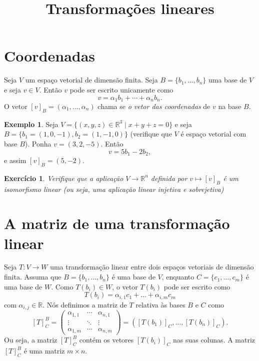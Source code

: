 \documentclass[12pt]{amsart}
\newcommand{\R}{\mathbb R}
\newtheorem{exercise}[theorem]{Exercício}
\theoremstyle{definition}
\newtheorem{example}[theorem]{Exemplo}
\begin{document}
\title{Transformações lineares}
\maketitle

\section{Coordenadas}
Seja $V$ um espaço vetorial de dimensão finita. Seja $B=\{b_1,\ldots,b_n\}$ uma base de $V$ e seja 
$v\in V$. Então $v$ pode ser escrito unicamente como 
\[
    v=\alpha_1b_1+\cdots+\alpha_nb_n.
\]
O vetor $[v]_B=(\alpha_1,\ldots,\alpha_n)$ chama se \emph{o vetor das coordenadas} de $v$ na base $B$.

\begin{example}
    Seja $V=\{(x,y,z)\in\R^3\mid x+y+z=0\}$ e seja $B=\{b_1=(1,0,-1),b_2=(1,-1,0)\}$ (verifique que $V$ é 
    espaço vetorial com base $B$). Ponha $v=(3,2,-5)$. Então 
    \[
        v=5b_1-2b_2,
    \]
    e assim $[v]_B=(5,-2)$. 
\end{example}

\begin{exercise}
    Verifique que a aplicação $V\to \R^n$ definida por $v\mapsto [v]_B$ é um isomorfismo linear (ou seja, uma aplicação linear 
    injetiva e sobrejetiva) 
\end{exercise}

\section{A matriz de uma transformação linear}
Seja $T:V\to W$ uma transformação linear entre dois espaços vetoriais de dimensão finita. Assuma que 
$B=\{b_1,\ldots,b_n\}$ é uma base de $V$, enquanto $C=\{c_1,\ldots,c_m\}$ é uma base de $W$. 
Como $T(b_i)\in W$,  o vetor $T(b_i)$ pode ser escrito como 
\[
    T(b_i)=\alpha_{i,1}c_1+\ldots+\alpha_{i,m}c_m
\]
com $\alpha_{i,j}\in \R$. Nós definimos a matriz de $T$ relativa às bases $B$ e $C$ como 
\[
    [T]_C^B=\begin{pmatrix} \alpha_{1,1} & \cdots & \alpha_{n,1}\\
        \vdots & \ddots & \vdots \\
        \alpha_{1,m} & \cdots & \alpha_{n,m}
    \end{pmatrix}=\left([T(b_1)]_C,\ldots,[T(b_n)]_C\right).
\]
Ou seja, a matriz $[T]^B_C$ contém os vetores $[T(b_i)]_C$ nas suas colunas. A matriz $[T]^B_C$ é uma matriz
$m\times n$. 
\end{document}
